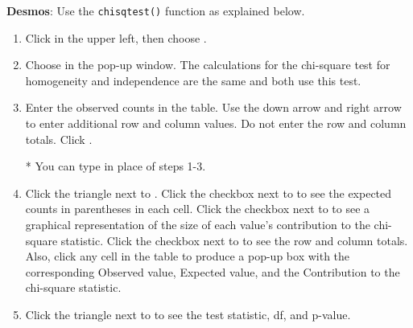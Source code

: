 \vspace{2mm}

\noindent \textbf{Desmos}:  Use the \texttt{chisqtest()} function as explained below.
\begin{enumerate}
\setlength{\itemsep}{0mm}
\item Click \calctext{+} in the upper left, then choose .  
\item Choose  in the pop-up window.  The calculations for the chi-square test for homogeneity and independence are the same and both use this test.
\item Enter the observed counts in the table.  Use the down arrow and right arrow to enter additional row and column values.  Do not enter the row and column totals.  Click .
\begin{center}
\end{center}
\indent\hspace{-4mm} * You can type  in place of steps 1-3.  
\vspace{1mm}
\item Click the triangle next to .  Click the checkbox next to  to see the expected counts in parentheses in each cell. Click the checkbox next to  to see a graphical representation of the size of each value's contribution to the chi-square statistic.  Click the checkbox next to  to see the row and column totals.  Also, click any cell in the table to produce a pop-up box with the corresponding Observed value,  Expected value, and the Contribution to the chi-square statistic.
\item Click the triangle next to  to see the test statistic, df, and p-value. 
\begin{center}
\end{center}
\end{enumerate}

